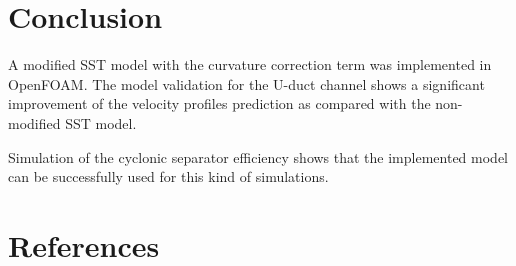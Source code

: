\documentclass[a4paper]{jpconf}
\begin{document}
\section{Conclusion}
A modified SST model with the curvature correction term was implemented in OpenFOAM. The model validation for the U-duct channel shows a significant improvement of the velocity profiles prediction as compared with the non-modified SST model.

Simulation of the cyclonic separator efficiency shows that the implemented model can be successfully used for this kind of simulations.

\section*{References}

\end{document}
